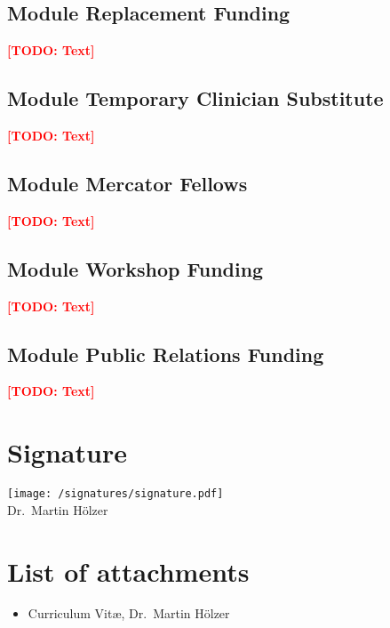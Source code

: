 \documentclass{scrartcl}
\newcommand{\todo}[1]{\xspace{\textcolor{red}{\bfseries[TODO: #1]}}\xspace}
\begin{document}
\subsection{Module Replacement Funding}
\todo{Text}

\subsection{Module Temporary Clinician Substitute}
\todo{Text}

\subsection{Module Mercator Fellows}
\todo{Text}

\subsection{Module Workshop Funding}
\todo{Text}

\subsection{Module Public Relations Funding}
\todo{Text}


\section{Signature}

\texttt{[image: /signatures/signature.pdf]}\\
Dr.\ Martin H\"olzer

\section{List of attachments}
\begin{itemize}
  \item Curriculum Vit\ae, Dr.\ Martin H\"olzer
\end{itemize}
\end{document}
